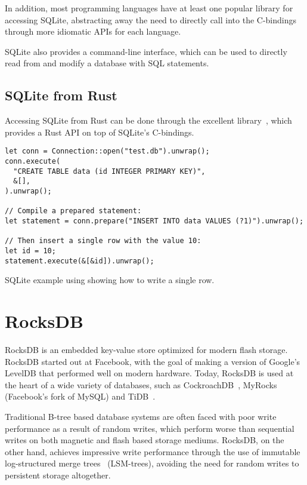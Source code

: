 In addition, most programming languages have at least one popular library for
accessing SQLite, abstracting away the need to directly call into the C-bindings
through more idiomatic APIs for each language.

SQLite also provides a command-line interface, which can be used to directly
read from and modify a database with SQL statements.

\subsection{SQLite from Rust}
Accessing SQLite from Rust can be done through the excellent 
library~\cite{rusqlite}, which
provides a Rust API on top of SQLite's C-bindings.

\begin{listing}[H]\label{lst:sqlite}
  \begin{verbatim}
let conn = Connection::open("test.db").unwrap();
conn.execute(
  "CREATE TABLE data (id INTEGER PRIMARY KEY)",
  &[],
).unwrap();

// Compile a prepared statement:
let statement = conn.prepare("INSERT INTO data VALUES (?1)").unwrap();

// Then insert a single row with the value 10:
let id = 10;
statement.execute(&[&id]).unwrap();

  \end{verbatim}

  \caption{SQLite example using  showing how to write a single
  row.}
\end{listing}

\section{RocksDB}\label{sec:rocksdb}
RocksDB is an embedded key-value store optimized for modern flash storage.
RocksDB started out at Facebook, with the goal of making a version of Google's
LevelDB that performed well on modern hardware. Today, RocksDB is used at the
heart of a wide variety of databases, such as CockroachDB~\cite{cockroach},
MyRocks~\cite{myrocks} (Facebook's fork of MySQL) and TiDB~\cite{tidb}.

Traditional B-tree based database systems are often faced with poor write
performance as a result of random writes, which perform worse than sequential
writes on both magnetic and flash based storage mediums. RocksDB, on the other
hand, achieves impressive write performance through the use of immutable
log-structured merge trees~\cite{lsm} (LSM-trees), avoiding the need for random
writes to persistent storage altogether.

